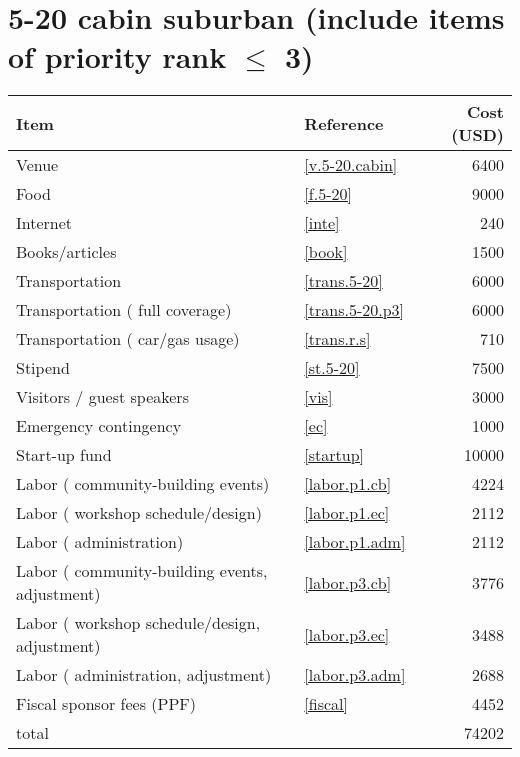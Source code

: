 \section*{5-20 cabin suburban (include items of priority rank $\leq$ 3)}
\begin{center}
\begin{tabular}{llr}
Item & Reference & Cost (USD) \\ \hline
Venue & \ref{v.5-20.cabin} & 6400 \\
Food & \ref{f.5-20} & 9000 \\
Internet & \ref{inte} & 240 \\
Books/articles & \ref{book} & 1500 \\
Transportation & \ref{trans.5-20} & 6000 \\
Transportation ( full coverage) & \ref{trans.5-20.p3} & 6000 \\
Transportation ( car/gas usage) & \ref{trans.r.s} & 710 \\
Stipend & \ref{st.5-20} & 7500 \\
Visitors / guest speakers & \ref{vis} & 3000 \\
Emergency contingency & \ref{ec} & 1000 \\
Start-up fund & \ref{startup} & 10000 \\
Labor ( community-building events) & \ref{labor.p1.cb} & 4224 \\
Labor ( workshop schedule/design) & \ref{labor.p1.ec} & 2112 \\
Labor ( administration) & \ref{labor.p1.adm} & 2112 \\
Labor ( community-building events, adjustment) & \ref{labor.p3.cb} & 3776 \\
Labor ( workshop schedule/design, adjustment) & \ref{labor.p3.ec} & 3488 \\
Labor ( administration, adjustment) & \ref{labor.p3.adm} & 2688 \\
Fiscal sponsor fees (PPF) & \ref{fiscal} & 4452 \\ \hline
total &  & 74202
\end{tabular}
\end{center}
\newpage
